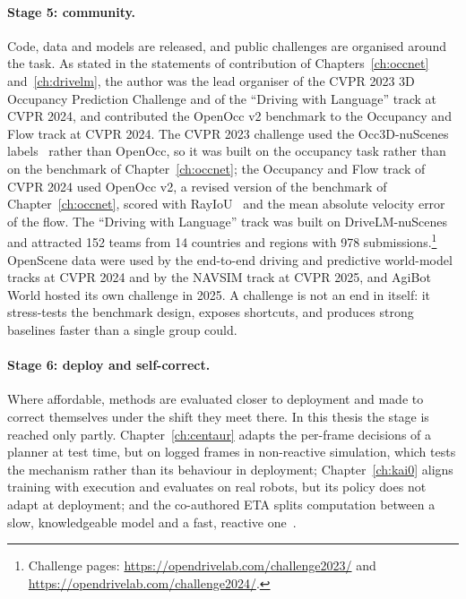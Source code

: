 \paragraph{Stage 5: community.} Code, data and models are released, and public challenges are organised around the task. As stated in the statements of contribution of Chapters~\ref{ch:occnet} and~\ref{ch:drivelm}, the author was the lead organiser of the CVPR 2023 3D Occupancy Prediction Challenge and of the ``Driving with Language'' track at CVPR 2024, and contributed the OpenOcc v2 benchmark to the Occupancy and Flow track at CVPR 2024. The CVPR 2023 challenge used the Occ3D-nuScenes labels~\cite{tian2023occ3d} rather than OpenOcc, so it was built on the occupancy task rather than on the benchmark of Chapter~\ref{ch:occnet}; the Occupancy and Flow track of CVPR 2024 used OpenOcc v2, a revised version of the benchmark of Chapter~\ref{ch:occnet}, scored with RayIoU~\cite{liu2024sparseocc} and the mean absolute velocity error of the flow. The ``Driving with Language'' track was built on DriveLM-nuScenes and attracted 152 teams from 14 countries and regions with 978 submissions.\footnote{Challenge pages: \url{https://opendrivelab.com/challenge2023/} and \url{https://opendrivelab.com/challenge2024/}.} OpenScene data were used by the end-to-end driving and predictive world-model tracks at CVPR 2024 and by the NAVSIM track at CVPR 2025, and AgiBot World hosted its own challenge in 2025. A challenge is not an end in itself: it stress-tests the benchmark design, exposes shortcuts, and produces strong baselines faster than a single group could.

\paragraph{Stage 6: deploy and self-correct.} Where affordable, methods are evaluated closer to deployment and made to correct themselves under the shift they meet there. In this thesis the stage is reached only partly. Chapter~\ref{ch:centaur} adapts the per-frame decisions of a planner at test time, but on logged frames in non-reactive simulation, which tests the mechanism rather than its behaviour in deployment; Chapter~\ref{ch:kai0} aligns training with execution and evaluates on real robots, but its policy does not adapt at deployment; and the co-authored ETA splits computation between a slow, knowledgeable model and a fast, reactive one~\cite{hamdan2025eta}.

